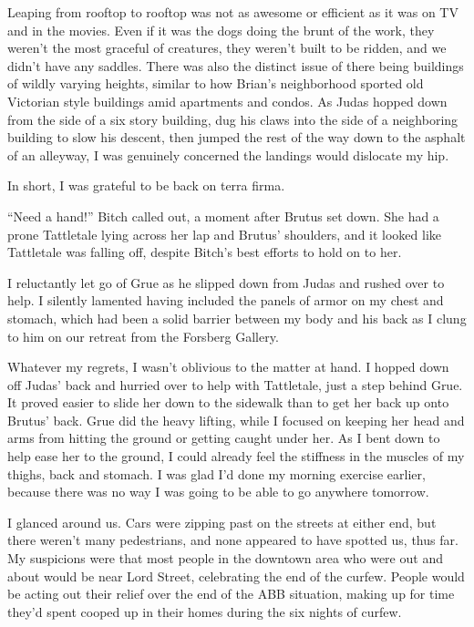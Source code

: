 





Leaping from rooftop to rooftop was not as awesome or efficient as it was on TV and in the movies.  Even if it was the dogs doing the brunt of the work, they weren't the most graceful of creatures, they weren't built to be ridden, and we didn't have any saddles.  There was also the distinct issue of there being buildings of wildly varying heights, similar to how Brian's neighborhood sported old Victorian style buildings amid apartments and condos.  As Judas hopped down from the side of a six story building, dug his claws into the side of a neighboring building to slow his descent, then jumped the rest of the way down to the asphalt of an alleyway, I was genuinely concerned the landings would dislocate my hip.



In short, I was grateful to be back on terra firma.



``Need a hand!'' Bitch called out, a moment after Brutus set down.  She had a prone Tattletale lying across her lap and Brutus' shoulders, and it looked like Tattletale was falling off, despite Bitch's best efforts to hold on to her.



I reluctantly let go of Grue as he slipped down from Judas and rushed over to help.  I silently lamented having included the panels of armor on my chest and stomach, which had been a solid barrier between my body and his back as I clung to him on our retreat from the Forsberg Gallery.



Whatever my regrets, I wasn't oblivious to the matter at hand.  I hopped down off Judas' back and hurried over to help with Tattletale, just a step behind Grue.  It proved easier to slide her down to the sidewalk than to get her back up onto Brutus' back.  Grue did the heavy lifting, while I focused on keeping her head and arms from hitting the ground or getting caught under her.  As I bent down to help ease her to the ground, I could already feel the stiffness in the muscles of my thighs, back and stomach.  I was glad I'd done my morning exercise earlier, because there was no way I was going to be able to go anywhere tomorrow.



I glanced around us.  Cars were zipping past on the streets at either end, but there weren't many pedestrians, and none appeared to have spotted us, thus far.  My suspicions were that most people in the downtown area who were out and about would be near Lord Street, celebrating the end of the curfew.  People would be acting out their relief over the end of the ABB situation, making up for time they'd spent cooped up in their homes during the six nights of curfew.



